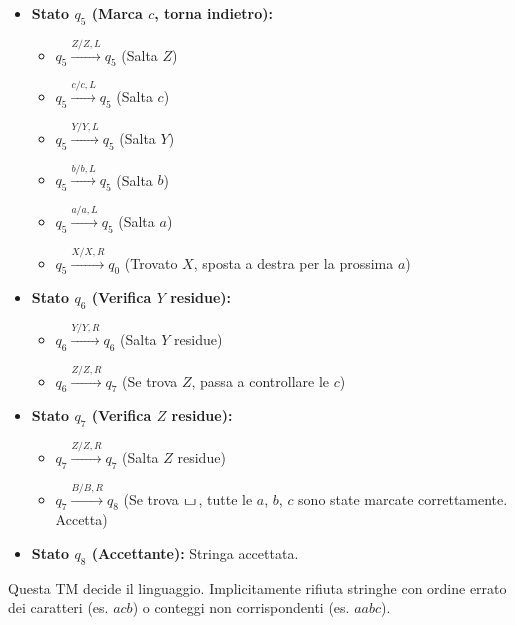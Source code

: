 \documentclass[a4paper]{article}
\theoremstyle{definition} %
\newcommand{\blankS}{\ensuremath{\raisebox{-0.15ex}{\scalebox{1.3}[0.7]{$\sqcup$}}\mkern2mu}}
\begin{document}
\begin{itemize}
\begin{itemize}
        \end{itemize}
    \item \textbf{Stato $q_5$ (Marca $c$, torna indietro):}
        \begin{itemize}
            \item $q_5 \xrightarrow{Z / Z, L} q_5$ (Salta $Z$)
            \item $q_5 \xrightarrow{c / c, L} q_5$ (Salta $c$)
            \item $q_5 \xrightarrow{Y / Y, L} q_5$ (Salta $Y$)
            \item $q_5 \xrightarrow{b / b, L} q_5$ (Salta $b$)
            \item $q_5 \xrightarrow{a / a, L} q_5$ (Salta $a$)
            \item $q_5 \xrightarrow{X / X, R} q_0$ (Trovato $X$, sposta a destra per la prossima $a$)
        \end{itemize}
    \item \textbf{Stato $q_6$ (Verifica $Y$ residue):}
        \begin{itemize}
            \item $q_6 \xrightarrow{Y / Y, R} q_6$ (Salta $Y$ residue)
            \item $q_6 \xrightarrow{Z / Z, R} q_7$ (Se trova $Z$, passa a controllare le $c$)
        \end{itemize}
    \item \textbf{Stato $q_7$ (Verifica $Z$ residue):}
        \begin{itemize}
            \item $q_7 \xrightarrow{Z / Z, R} q_7$ (Salta $Z$ residue)
            \item $q_7 \xrightarrow{B / B, R} q_8$ (Se trova \blankS, tutte le $a$, $b$, $c$ sono state marcate correttamente. Accetta)
        \end{itemize}
    \item \textbf{Stato $q_8$ (Accettante):} Stringa accettata.
\end{itemize}
Questa TM decide il linguaggio. Implicitamente rifiuta stringhe con ordine errato dei caratteri (es. $acb$) o conteggi non corrispondenti (es. $aabc$).
\end{document}
